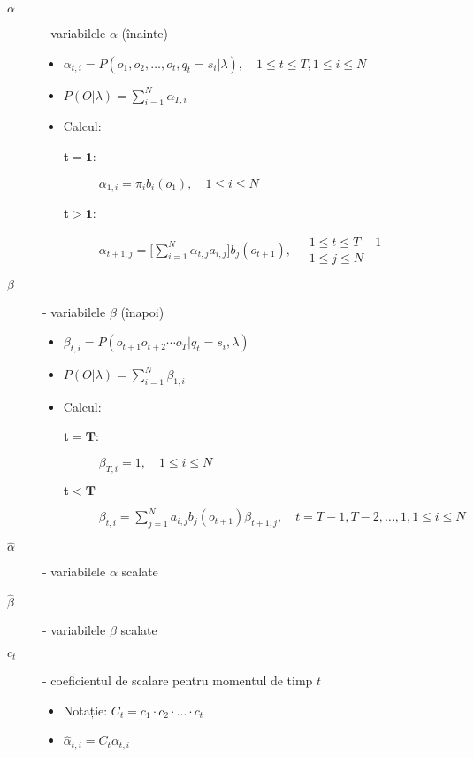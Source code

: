 \documentclass[12pt]{article}
\begin{document}
\begin{description}
\item[$\alpha$] - variabilele $\alpha$ (înainte)
  \begin{itemize}
  \item $\alpha_{t,i}=P(o_1,o_2,\ldots,o_t, q_t = s_i \vert \lambda), \quad  \scriptstyle{1 \le t \le T, 1 \le i \le N}$
  \item $P(O \vert \lambda) = \displaystyle\sum_{i=1}^{N}\alpha_{T,i}$
  \item Calcul:
    \begin{description}
    \item[$\mathbf{t=1}$:] $\alpha_{1,i}=\pi_ib_i(o_1), \quad \scriptstyle{1 \le i \le N}$
    \item[$\mathbf{t>1}$:] $\alpha_{t+1,j}=\Big[
        \displaystyle\sum_{i=1}^{N}\alpha_{t,j}a_{i,j}\Big]
        b_{j}(o_{t+1}), \quad \substack{1 \le t \le T-1\\1\le j \le N}$ 
    \end{description}
  \end{itemize}
\item[$\beta$] - variabilele $\beta$ (înapoi)
  \begin{itemize}
  \item $\beta_{t,i}=P(o_{t+1} o_{t+2} \cdots o_{T} \vert q_t = s_i,
      \lambda)$
    \item $P(O \vert \lambda) = \displaystyle\sum_{i=1}^{N}\beta_{1,i}$
    \item Calcul:
      \begin{description}
      \item[$\mathbf{t=T}$:] $\beta_{T,i}=1,\scriptstyle{\quad 1 \le i \le N}$
      \item[$\mathbf{t<T}$] $\beta_{t,i}=\displaystyle\sum_{j=1}^{N}a_{i,j}b_j(o_{t+1})\beta_{t+1,j},
    \quad \scriptstyle{t = T-1, T-2, \ldots , 1, 1 \le i \le N}$
      \end{description}
  \end{itemize}
\item[$\hat{\alpha}$] - variabilele $\alpha$ scalate
\item[$\hat{\beta}$] - variabilele $\beta$ scalate
\item[$c_t$] - coeficientul de scalare pentru momentul de timp $t$
  \begin{itemize}
  \item Notație: $C_t = c_1 \cdot c_2 \cdot \ldots \cdot c_t$
  \item $\hat{\alpha}_{t,i} = C_t\alpha_{t,i}$
  \end{itemize}
\end{description}  
\end{document}
